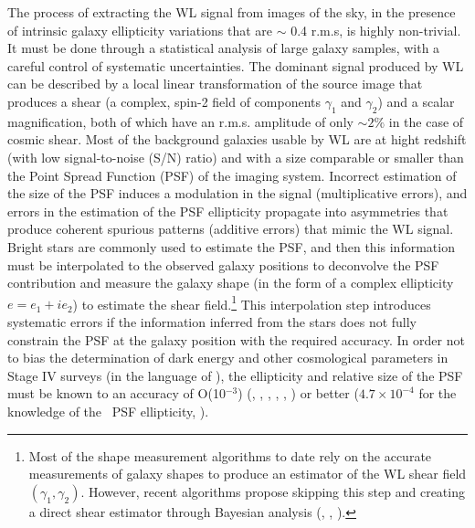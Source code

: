 \documentclass[11pt,preprint,flushrt]{aastex}
\begin{document}
The process of extracting the WL signal from images of the sky, in the presence of intrinsic galaxy ellipticity variations that are $\sim$ 0.4 r.m.s, is highly non-trivial. It must be done through a statistical analysis of large galaxy samples, with a careful control of systematic uncertainties. The dominant signal produced by WL can be described by a local linear transformation of the source image that produces a shear (a complex, spin-2 field of components $\gamma_1$ and $\gamma_2$) and a scalar magnification, both of which have an r.m.s. amplitude of only $\sim 2 \%$ in the case of cosmic shear. Most of the background galaxies usable by WL are at hight redshift (with low signal-to-noise (S/N) ratio) and with a size comparable or smaller than the Point Spread Function (PSF) of the imaging system. Incorrect estimation of the size of the PSF induces a modulation in the signal (multiplicative errors), and errors in the estimation of the PSF ellipticity propagate into asymmetries that produce coherent spurious patterns (additive errors) that mimic the WL signal. Bright stars are commonly used to estimate the PSF, and then this information must be interpolated to the observed galaxy positions to deconvolve the PSF contribution and measure the galaxy shape (in the form of a complex ellipticity $e=e_1 + i e_2$) to estimate the shear field.\footnote{Most of the shape measurement algorithms to date rely on the accurate measurements of galaxy shapes to produce an estimator of the WL shear field $(\gamma_1, \gamma_2)$. However, recent algorithms propose skipping this step and creating a direct shear estimator through Bayesian analysis (\citealt{bernstein14}, \citealt{bernstein15}, \citealt{schneider15}).} This interpolation step introduces systematic errors if the information inferred from the stars does not fully constrain the PSF at the galaxy position with the required accuracy. In order not to bias the determination of dark energy and other cosmological parameters in Stage IV surveys (in the language of \citealt{albrecht06}), the ellipticity and relative size of the PSF must be known to an accuracy of O(10$^{-3}$) (\citealt{huterer06}, \citealt{amara08}, \citealt{paulin08}, \citealt{paulin09}, \citealt{massey13}, \citealt{cropper13}) or better ($4.7 \times 10^{-4}$ for the knowledge of the \wfa\ PSF ellipticity, \citealt{spergel13}).

\end{document}
